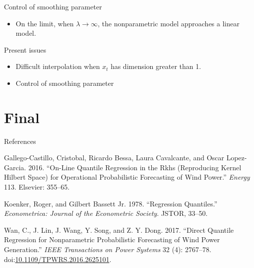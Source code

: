 \documentclass[11pt]{beamer}
\begin{document}
\begin{frame}{Control of smoothing parameter}
\begin{itemize}

\item
On the limit, when \(\lambda \rightarrow \infty\), the nonparametric
model approaches a linear model.
\end{itemize}

\end{frame}

\begin{frame}{Present issues}

\begin{itemize}

\item
Difficult interpolation when \(x_t\) has dimension greater than 1.
\item
Control of smoothing parameter
\end{itemize}

\end{frame}

\section{Final}\label{final}

\begin{frame}{References}

\tiny

\hypertarget{refs}{}
\hypertarget{ref-gallego2016line}{}
Gallego-Castillo, Cristobal, Ricardo Bessa, Laura Cavalcante, and Oscar
Lopez-Garcia. 2016. ``On-Line Quantile Regression in the Rkhs
(Reproducing Kernel Hilbert Space) for Operational Probabilistic
Forecasting of Wind Power.'' \emph{Energy} 113. Elsevier: 355--65.

\hypertarget{ref-koenker1978regression}{}
Koenker, Roger, and Gilbert Bassett Jr. 1978. ``Regression Quantiles.''
\emph{Econometrica: Journal of the Econometric Society}. JSTOR, 33--50.

\hypertarget{ref-wan_direct_2017}{}
Wan, C., J. Lin, J. Wang, Y. Song, and Z. Y. Dong. 2017. ``Direct
Quantile Regression for Nonparametric Probabilistic Forecasting of Wind
Power Generation.'' \emph{IEEE Transactions on Power Systems} 32 (4):
2767--78.
doi:\href{https://doi.org/10.1109/TPWRS.2016.2625101}{10.1109/TPWRS.2016.2625101}.

\end{frame}
\end{document}
